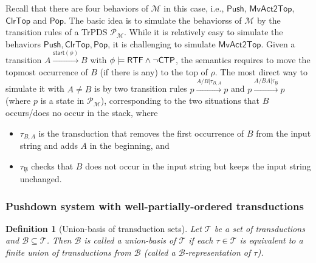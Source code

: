 \documentclass[preprint,12pt]{elsarticle}
\newtheorem{definition}{Definition}
\newcommand\Mm{{\mathcal{M} }}
\newcommand\Pp{{\mathcal{P} }}
\newcommand\ctpflag{{\sf CTP}}
\newcommand\rtfflag{{\sf RTF}}
\newcommand\startactivity{{\mathsf{start} }}
\newcommand\Aut{{\mathfrak{A} }}
\newcommand\TranSet{{\mathscr{T} }}
\newcommand\Tranbasis{{\mathscr{B} }}
\newcommand{\TrPDS}{\textsf{TrPDS}}
\newcommand\push{\mathsf{Push}}
\newcommand\Pop{\mathsf{Pop}}
\newcommand\mvacttop{\mathsf{MvAct2Top}}
\newcommand\clrtop{\mathsf{ClrTop}}
\begin{document}
{Recall that there are four behaviors of $\Mm$ in this case, i.e., $\push$, $\mvacttop$, $\clrtop$ and $\Pop$.
The basic idea is to simulate the behaviorss of $\Mm$ by the transition rules of a {\TrPDS} $\Pp_{\Mm}$. While it is relatively easy to simulate the behaviors $\push, \clrtop, \Pop$, %
it is challenging to simulate $\mvacttop$. Given a transition $A\xrightarrow{\startactivity(\phi)}B$ with $\phi\models\rtfflag\wedge\neg\ctpflag$, the semantics requires to move the topmost occurrence of $B$ (if there is any) to the top of $\rho$. The most direct way to simulate it with $A \neq B$ is by two transition rules $p \xrightarrow{A / B | \tau_{B, A}} p$ and  $p \xrightarrow{A / BA | \tau_{\not B}} p$
(where $p$ is a state in $\Pp_\Mm$), corresponding to the two situations that $B$ occurs/does no occur in the stack, where 
\begin{itemize}
\item $\tau_{B, A}$ is the transduction that removes the first occurrence of $B$ from the input string and adds $A$ in the beginning, and
%
\item $\tau_{\not B}$ checks that $B$ does not occur in the input string but keeps the input string unchanged. 
\end{itemize}
}

\subsubsection{Pushdown system with well-partially-ordered transductions}\label{sec-wpotrpds}

\begin{definition}[Union-basis of transduction sets]\label{def-ubasis}
Let $\TranSet$ be a set of transductions and $\Tranbasis \subseteq \TranSet$. Then $\Tranbasis$ is called a \emph{union-basis} of $\TranSet$ if each $\tau \in \TranSet$ is equivalent to a finite union of transductions from $\Tranbasis$ (called a $\Tranbasis$-representation of $\tau$). 
\end{definition}
\end{document}
